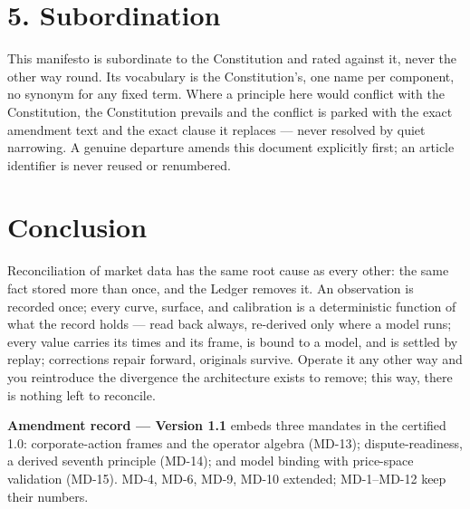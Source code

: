 \documentclass[11pt,a4paper]{article}
\begin{document}
\section{5. Subordination}

This manifesto is subordinate to the Constitution and rated against it,
never the other way round. Its vocabulary is the Constitution's, one name
per component, no synonym for any fixed term. Where a principle here would
conflict with the Constitution, the Constitution prevails and the
conflict is parked with the exact amendment text and the exact clause it
replaces --- never resolved by quiet narrowing. A genuine departure amends
this document explicitly first; an article identifier is never reused or
renumbered.

\section{Conclusion}

Reconciliation of market data has the same root cause as every other: the
same fact stored more than once, and the Ledger removes it. An observation
is recorded once; every curve, surface, and calibration is a deterministic
function of what the record holds --- read back always, re-derived only
where a model runs; every value carries its times and its frame, is bound
to a model, and is settled by replay; corrections repair forward,
originals survive. Operate it any other way and you reintroduce the
divergence the architecture exists to remove; this way, there is nothing
left to reconcile.

\noindent\textbf{Amendment record --- Version 1.1} embeds three mandates
in the certified 1.0: corporate-action frames and the operator algebra
(MD-13); dispute-readiness, a derived seventh principle (MD-14); and model
binding with price-space validation (MD-15). MD-4, MD-6, MD-9, MD-10
extended; MD-1--MD-12 keep their numbers.
\end{document}
